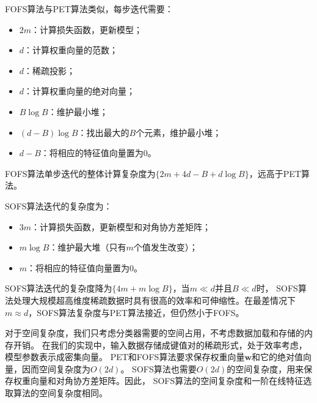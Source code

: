 \documentclass[doctor]{ustcthesis}
\def \w  {\mathbf{w}}
\begin{document}
FOFS算法与PET算法类似，每步迭代需要：
\begin{itemize}
    \item $2m$：计算损失函数，更新模型；
    \item $d$：计算权重向量的范数；
    \item $d$：稀疏投影；
    \item $d$：计算权重向量的绝对向量；
    \item $B\log B$：维护最小堆；
    \item $(d-B)\log B$：找出最大的$B$个元素，维护最小堆；
    \item $d-B$：将相应的特征值向量置为$0$。
\end{itemize}
FOFS算法单步迭代的整体计算复杂度为$\{2m + 4d - B + d\log
B\}$，远高于PET算法。

SOFS算法迭代的复杂度为：
\begin{itemize}
    \item $3m$：计算损失函数，更新模型和对角协方差矩阵；
    \item $m\log B$：维护最大堆（只有$m$个值发生改变）；
    \item $m$：将相应的特征值向量置为$0$。
\end{itemize}
SOFS算法迭代的复杂度降为$\{4m + m\log B\}$，当$m\ll d$并且$B\ll d$时，
SOFS算法处理大规模超高维度稀疏数据时具有很高的效率和可伸缩性。在最差情况下
$m\approx d$，SOFS算法复杂度与PET算法接近，但仍然小于FOFS。

对于空间复杂度，我们只考虑分类器需要的空间占用，不考虑数据加载和存储的内存开销。
在我们的实现中，输入数据存储成键值对的稀疏形式，处于效率考虑，模型参数表示成密集向量。
PET和FOFS算法要求保存权重向量$\w$和它的绝对值向量，因而空间复杂度为$O(2d)$。
SOFS算法也需要$O(2d)$的空间复杂度，用来保存权重向量和对角协方差矩阵。因此，
SOFS算法的空间复杂度和一阶在线特征选取算法的空间复杂度相同。
\end{document}
